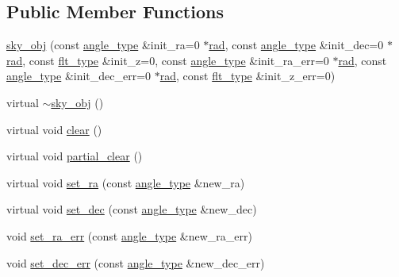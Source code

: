 \subsection*{Public Member Functions}
\begin{DoxyCompactItemize}
\item 
\hyperlink{classIceBRG_1_1sky__obj_a7f8351a5aa2b3e6f66132cfb2164b137}{sky\+\_\+obj} (const \hyperlink{namespaceIceBRG_a688eeb0811a2474b20b667ed2e9625a1}{angle\+\_\+type} \&init\+\_\+ra=0 $\ast$\hyperlink{namespaceIceBRG_a556de4acca26a5661d50a5b75880e95f}{rad}, const \hyperlink{namespaceIceBRG_a688eeb0811a2474b20b667ed2e9625a1}{angle\+\_\+type} \&init\+\_\+dec=0 $\ast$\hyperlink{namespaceIceBRG_a556de4acca26a5661d50a5b75880e95f}{rad}, const \hyperlink{lib_2IceBRG__main_2common_8h_ad0f130a56eeb944d9ef2692ee881ecc4}{flt\+\_\+type} \&init\+\_\+z=0, const \hyperlink{namespaceIceBRG_a688eeb0811a2474b20b667ed2e9625a1}{angle\+\_\+type} \&init\+\_\+ra\+\_\+err=0 $\ast$\hyperlink{namespaceIceBRG_a556de4acca26a5661d50a5b75880e95f}{rad}, const \hyperlink{namespaceIceBRG_a688eeb0811a2474b20b667ed2e9625a1}{angle\+\_\+type} \&init\+\_\+dec\+\_\+err=0 $\ast$\hyperlink{namespaceIceBRG_a556de4acca26a5661d50a5b75880e95f}{rad}, const \hyperlink{lib_2IceBRG__main_2common_8h_ad0f130a56eeb944d9ef2692ee881ecc4}{flt\+\_\+type} \&init\+\_\+z\+\_\+err=0)
\item 
virtual \hyperlink{classIceBRG_1_1sky__obj_adf2ec2bb6c1c977ed520828ecc2f3d68}{$\sim$sky\+\_\+obj} ()
\item 
virtual void \hyperlink{classIceBRG_1_1sky__obj_ad38ff17a187253f6f2fb4ef81ea03c59}{clear} ()
\item 
virtual void \hyperlink{classIceBRG_1_1sky__obj_a693bd041e7d6fef2e65a3eda379fd779}{partial\+\_\+clear} ()
\item 
virtual void \hyperlink{classIceBRG_1_1sky__obj_aaa784c2db38e7dd21d80f72cbab0bf45}{set\+\_\+ra} (const \hyperlink{namespaceIceBRG_a688eeb0811a2474b20b667ed2e9625a1}{angle\+\_\+type} \&new\+\_\+ra)
\item 
virtual void \hyperlink{classIceBRG_1_1sky__obj_a21d73e1e799792c8caaf0185032a7a08}{set\+\_\+dec} (const \hyperlink{namespaceIceBRG_a688eeb0811a2474b20b667ed2e9625a1}{angle\+\_\+type} \&new\+\_\+dec)
\item 
void \hyperlink{classIceBRG_1_1sky__obj_a7daeb396ea2789507400e51f8f7fad06}{set\+\_\+ra\+\_\+err} (const \hyperlink{namespaceIceBRG_a688eeb0811a2474b20b667ed2e9625a1}{angle\+\_\+type} \&new\+\_\+ra\+\_\+err)
\item 
void \hyperlink{classIceBRG_1_1sky__obj_a57c35b60f33d0ca12ba88fb1dbce33a2}{set\+\_\+dec\+\_\+err} (const \hyperlink{namespaceIceBRG_a688eeb0811a2474b20b667ed2e9625a1}{angle\+\_\+type} \&new\+\_\+dec\+\_\+err)

\end{DoxyCompactItemize}
